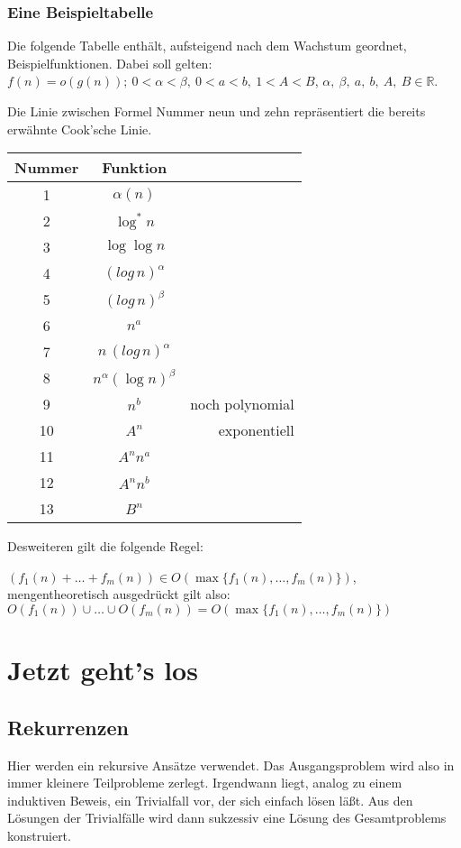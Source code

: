 \documentclass{scrreprt}%
\theoremstyle{break}
\begin{document}
\subsection{Eine Beispieltabelle}
Die folgende Tabelle enthält, aufsteigend nach dem Wachstum geordnet, Beispielfunktionen.
Dabei soll gelten: $f(n)=o(g(n));\ 0 < \alpha < \beta,\ 0<a<b,\ 1<A<B$,
$\alpha,\ \beta,\ a,\ b, \ A,\ B \in \mathbb{R}$.

Die Linie zwischen Formel Nummer neun und zehn repräsentiert die bereits erwähnte Cook'sche Linie.
\bigskip

\begin{table}[h]
\begin{tabular}{c|cr}
    Nummer      &Funktion       \\ \hline
    1   &       $\alpha (n)$    \\
    2   &       $\log^{*}n$     \\
    3   &       $\log \log n $  \\
    4   &       ${(log \, n)}^{\alpha}$ \\
    5   &       ${(log \, n)}^{\beta}$  \\
    6   &       $n^a$           \\
    7   &       $n \, (log \, n)^{\alpha}$      \\
    8   &       $n^{\alpha}{(\log n)}^{\beta}$  \\
    9   &       $n^b$           & noch polynomial\\ \hline
    10  &       $A^n$           & exponentiell\\
    11  &       $A^n n^a$       \\
    12  &       $A^n n^b$       \\
    13  &       $B^n$           
\end{tabular}
\end{table}

Desweiteren gilt die folgende Regel:

\noindent
$(f_1(n)+ \dots +f_m(n)) \in O (\max\{f_1(n),\dots,f_m(n)\})$, mengentheoretisch ausgedrückt gilt also: $O(f_1(n)) \cup \dots
\cup O(f_m(n)) = O (\max\{f_1(n),\dots,f_m(n)\})$


\chapter{Jetzt geht's los}

\section{Rekurrenzen}
Hier werden ein rekursive Ansätze verwendet. Das Ausgangsproblem wird also in immer kleinere Teilprobleme zerlegt.
Irgendwann liegt, analog zu einem induktiven Beweis, ein Trivialfall vor, der sich einfach lösen läßt. Aus den Lösungen der Trivialfälle
wird dann sukzessiv eine Lösung des Gesamtproblems konstruiert.
\end{document}
